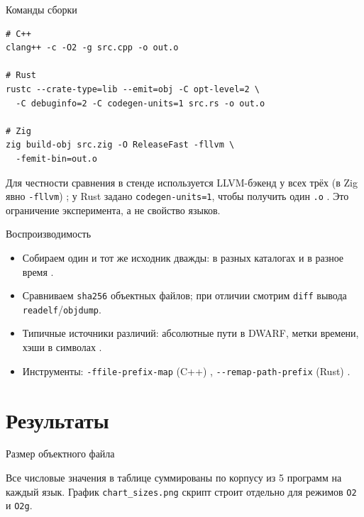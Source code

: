 \documentclass[aspectratio=169,11pt]{beamer}
\begin{document}
\begin{frame}[fragile]{Команды сборки}
\begin{lstlisting}[style=shell]
# C++
clang++ -c -O2 -g src.cpp -o out.o

# Rust
rustc --crate-type=lib --emit=obj -C opt-level=2 \
  -C debuginfo=2 -C codegen-units=1 src.rs -o out.o

# Zig
zig build-obj src.zig -O ReleaseFast -fllvm \
  -femit-bin=out.o
\end{lstlisting}
  \smallskip
  Для честности сравнения в стенде используется LLVM-бэкенд у всех трёх (в Zig явно \texttt{-fllvm}) \cite{zigdoc}; у Rust задано \texttt{codegen-units=1}, чтобы получить один \texttt{.o} \cite{rustcbook}. Это ограничение эксперимента, а не свойство языков.
\end{frame}

\begin{frame}{Воспроизводимость}
  \begin{itemize}
    \item Собираем один и тот же исходник дважды: в разных каталогах и в разное время \cite{reprod}.
    \item Сравниваем \texttt{sha256} объектных файлов; при отличии смотрим \texttt{diff} вывода \texttt{readelf}/\texttt{objdump}.
    \item Типичные источники различий: абсолютные пути в DWARF, метки времени, хэши в символах \cite{reprod}.
    \item Инструменты: \texttt{-ffile-prefix-map} (C++) \cite{reprod}, \texttt{-{}-remap-path-prefix} (Rust) \cite{rustcbook}.
  \end{itemize}
\end{frame}

\section{Результаты}

\begin{frame}{Размер объектного файла}
  \small
  \begin{center}
    \setlength{\tabcolsep}{4pt}
  \end{center}

  \smallskip
  \scriptsize
  Все числовые значения в таблице суммированы по корпусу из 5 программ на каждый язык.
  График \texttt{chart\_sizes.png} скрипт строит отдельно для режимов
  \texttt{O2} и \texttt{O2g}.
\end{frame}
\end{document}
